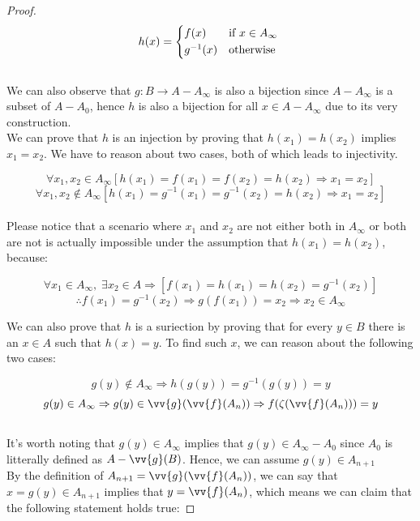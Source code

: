 \begin{proof}
    \begin{equation*}
        h(x) = 
        \begin{cases*}
            f(x)      & \text{if} \( x \in A_{\infty} \)  \\
            g^{-1}(x) & \text{otherwise}
        \end{cases*}
    \end{equation*} \\


    We can also observe that $g : B \rightarrow A - A_{\infty}$ is also a bijection since $A - A_{\infty}$ is a subset of 
    $A - A_0$, hence $h$ is also a bijection for all $x \in A - A_{\infty}$ due to its very construction. \\

    We can prove that $h$ is an injection by proving that $h(x_1) = h(x_2)$ implies $x_1 = x_2$. We have to 
    reason about two cases, both of which leads to injectivity.

    $$ \forall x_1, x_2 \in A_{\infty} [ h(x_1) = f(x_1) = f(x_2) = h(x_2) \Rightarrow x_1 = x_2 ] $$
    $$ \forall x_1, x_2 \notin A_{\infty} [ h(x_1) = g^{-1}(x_1) = g^{-1}(x_2) = h(x_2) \Rightarrow x_1 = x_2 ] $$ \\
    
    Please notice that a scenario where $x_1$ and $x_2$ are not either both in $A_{\infty}$ or both are not is actually impossible under 
    the assumption that $h(x_1) = h(x_2)$, because:

    $$ \forall x_1 \in A_{\infty},\; \exists x_2 \in A \Rightarrow [ f(x_1) = h(x_1) = h(x_2) = g^{-1}(x_2) ] $$
    $$ \therefore f(x_1) = g^{-1}(x_2) \Rightarrow  g(f(x_1)) = x_2 \Rightarrow x_2 \in A_{\infty}           $$

    We can also prove that $h$ is a suriection by proving that for every $y \in B$ there is an $x \in A$ such that $h(x) = y$. To 
    find such $x$, we can reason about the following two cases:

    $$ g(y) \notin A_{\infty} \Rightarrow h(g(y)) = g^{-1}(g(y)) = y $$
    $$ g(y) \in A_{\infty} \Rightarrow g(y) \in \vv{g}(\vv{f}(A_n)) \Rightarrow f(\zeta(\vv{f}(A_n))) = y$$ \\

    It's worth noting that $g(y) \in A_{\infty}$ implies that $g(y) 
    \in A_{\infty} - A_0$ since $A_0$ is litterally defined as
    $A - \vv{g}(B)$. Hence, we can assume $g(y) \in A_{n + 1}$ \\

    By the definition of $A_{n + 1} = \vv{g}(\vv{f}(A_{n}))$, we can say that 
    $x = g(y) \in A_{n + 1}$ implies that $y = \vv{f}(A_n)$, which means we can 
    claim that the following statement holds true:


\end{proof}
